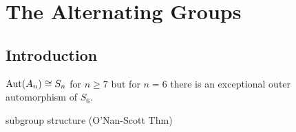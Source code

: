 
    
    




\section{The Alternating Groups}
\subsection{Introduction}
$\mathrm{Aut}(A_n)\cong S_n$ for $n\geq 7$ but for $n=6$ there is an exceptional outer automorphism of $S_6$.

subgroup structure (O'Nan-Scott Thm)


%     
